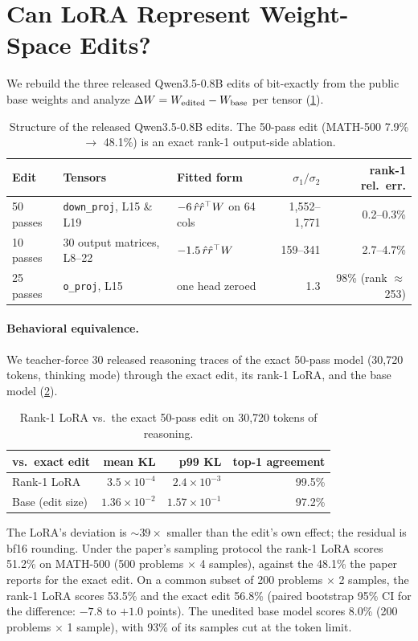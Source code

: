 \section{Can LoRA Represent Weight-Space Edits?}
\label{sec:representation}

We rebuild the three released Qwen3.5-0.8B edits of \citet{takehi2026logs} bit-exactly from the public base weights
and analyze $\Delta W=W_{\text{edited}}-W_{\text{base}}$ per tensor (\cref{tab:rank}).

\begin{table}[t]
\centering
\caption{Structure of the released Qwen3.5-0.8B edits. The 50-pass edit (MATH-500 7.9\% $\to$ 48.1\%) is an exact
rank-1 output-side ablation.}
\label{tab:rank}
\small
\begin{tabular}{lllrr}
\toprule
Edit & Tensors & Fitted form & $\sigma_1/\sigma_2$ & rank-1 rel.\ err. \\
\midrule
50 passes & \texttt{down\_proj}, L15 \& L19 & $-6\,\hat{r}\hat{r}^{\top}W$ on 64 cols & 1{,}552--1{,}771 & 0.2--0.3\% \\
10 passes & 30 output matrices, L8--22 & $-1.5\,\hat{r}\hat{r}^{\top}W$ & 159--341 & 2.7--4.7\% \\
25 passes & \texttt{o\_proj}, L15 & one head zeroed & 1.3 & 98\% (rank $\approx$253) \\
\bottomrule
\end{tabular}
\end{table}

\paragraph{Behavioral equivalence.} We teacher-force 30 released reasoning traces of the exact 50-pass model
(30{,}720 tokens, thinking mode) through the exact edit, its rank-1 LoRA, and the base model (\cref{tab:equiv}).

\begin{table}[t]
\centering
\caption{Rank-1 LoRA vs.\ the exact 50-pass edit on 30{,}720 tokens of reasoning.}
\label{tab:equiv}
\small
\begin{tabular}{lrrr}
\toprule
vs.\ exact edit & mean KL & p99 KL & top-1 agreement \\
\midrule
Rank-1 LoRA & $3.5\times10^{-4}$ & $2.4\times10^{-3}$ & 99.5\% \\
Base (edit size) & $1.36\times10^{-2}$ & $1.57\times10^{-1}$ & 97.2\% \\
\bottomrule
\end{tabular}
\end{table}

The LoRA's deviation is ${\sim}39\times$ smaller than the edit's own effect; the residual is bf16 rounding.
Under the paper's sampling protocol the rank-1 LoRA scores 51.2\% on MATH-500 (500 problems $\times$ 4 samples), against the 48.1\% the paper reports for the exact edit. On a common subset of 200 problems $\times$ 2 samples, the rank-1 LoRA scores 53.5\% and the exact edit 56.8\% (paired bootstrap 95\% CI for the difference: $-7.8$ to $+1.0$ points). The unedited base model scores 8.0\% (200 problems $\times$ 1 sample), with 93\% of its samples cut at the token limit.
